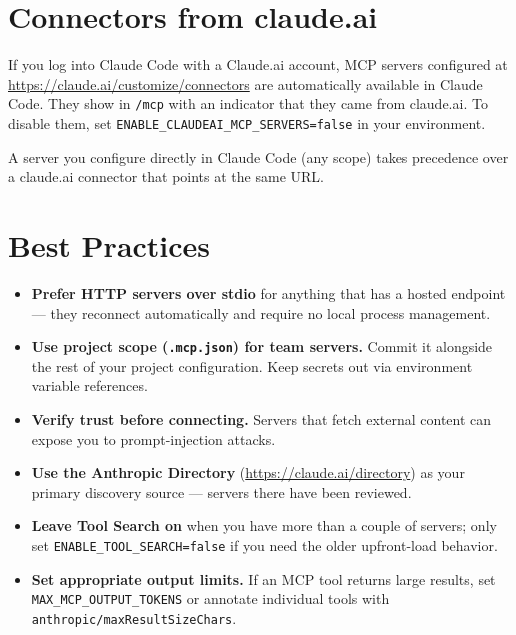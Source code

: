 \section{Connectors from claude.ai}
\label{sec:claudeai-connectors}


If you log into Claude Code with a Claude.ai account, MCP servers
configured at
\url{https://claude.ai/customize/connectors} are automatically available in
Claude Code. They show in \texttt{/mcp} with an indicator that they came
from claude.ai. To disable them, set
\texttt{ENABLE\_CLAUDEAI\_MCP\_SERVERS=false} in your environment.

A server you configure directly in Claude Code (any scope) takes precedence
over a claude.ai connector that points at the same URL.

\section{Best Practices}
\label{sec:mcp-best-practices}


\begin{itemize}
  \item \textbf{Prefer HTTP servers over stdio} for anything that has a hosted
        endpoint — they reconnect automatically and require no local process
        management.
  \item \textbf{Use project scope (\texttt{.mcp.json}) for team servers.}
        Commit it alongside the rest of your project configuration. Keep
        secrets out via environment variable references.
  \item \textbf{Verify trust before connecting.} Servers that fetch external
        content can expose you to prompt-injection attacks.
  \item \textbf{Use the Anthropic Directory} (\url{https://claude.ai/directory})
        as your primary discovery source — servers there have been reviewed.
  \item \textbf{Leave Tool Search on} when you have more than a couple of
        servers; only set \texttt{ENABLE\_TOOL\_SEARCH=false} if you need
        the older upfront-load behavior.
  \item \textbf{Set appropriate output limits.} If an MCP tool returns large
        results, set \texttt{MAX\_MCP\_OUTPUT\_TOKENS} or annotate individual
        tools with \texttt{anthropic/maxResultSizeChars}.
\end{itemize}

